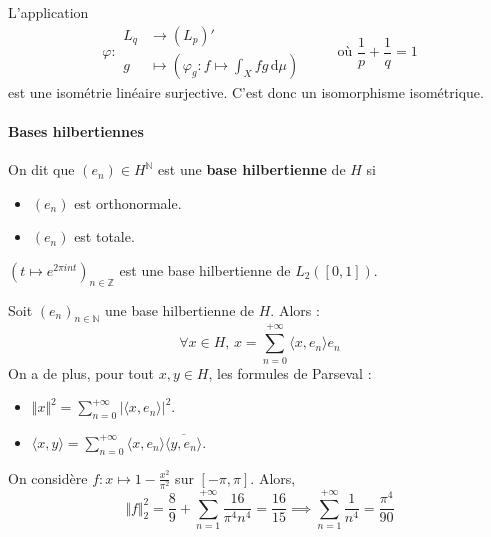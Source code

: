 
  \begin{application}
    L'application
    \[
    \varphi :
    \begin{array}{ll}
      L_q &\rightarrow (L_p)' \\
      g &\mapsto \left( \varphi_g : f \mapsto \int_X f g \, \mathrm{d}\mu \right)
    \end{array}
    \qquad \text{ où } \frac{1}{p} + \frac{1}{q} = 1
    \]
    est une isométrie linéaire surjective. C'est donc un isomorphisme isométrique.
  \end{application}

  \paragraph{Bases hilbertiennes}


  \begin{definition}
    On dit que $(e_n) \in H^{\mathbb{N}}$ est une \textbf{base hilbertienne} de $H$ si
    \begin{itemize}
      \item $(e_n)$ est orthonormale.
      \item $(e_n)$ est totale.
    \end{itemize}
  \end{definition}

  \begin{example}
    $(t \mapsto e^{2\pi int})_{n \in \mathbb{Z}}$ est une base hilbertienne de $L_2([0,1])$.
  \end{example}

  \begin{theorem}
    Soit $(e_n)_{n \in \mathbb{N}}$ une base hilbertienne de $H$. Alors :
    \[ \forall x \in H, \, x = \sum_{n=0}^{+\infty} \langle x, e_n \rangle e_n \]
    On a de plus, pour tout $x, y \in H$, les formules de Parseval :
    \begin{itemize}
      \item $\Vert x \Vert^2 = \sum_{n=0}^{+\infty} \vert \langle x, e_n \rangle \vert^2$.
      \item $\langle x, y \rangle = \sum_{n=0}^{+\infty} \langle x, e_n \rangle \overline{\langle y, e_n \rangle}$.
    \end{itemize}
  \end{theorem}


  \begin{application}
    On considère $f : x \mapsto 1 - \frac{x^2}{\pi^2}$ sur $[-\pi, \pi]$. Alors,
    \[ \Vert f \Vert^2_2 = \frac{8}{9} + \sum_{n=1}^{+\infty} \frac{16}{\pi^4 n^4} = \frac{16}{15} \implies \sum_{n=1}^{+\infty} \frac{1}{n^4} = \frac{\pi^4}{90} \]
  \end{application}

